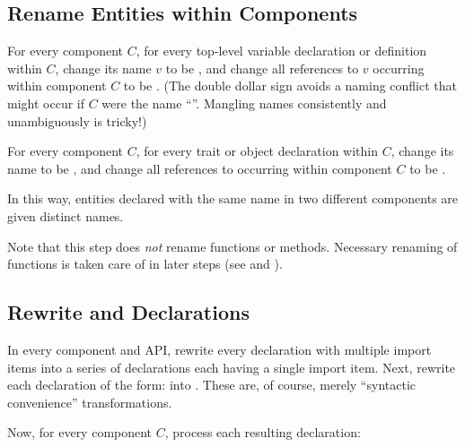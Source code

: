 \subsection{Rename Entities within Components}

For every component $C$, for every top-level variable declaration or definition
within $C$, change its name $v$ to be , and change
all references to $v$ occurring within component $C$ to be .
(The double dollar sign avoids a naming conflict that might occur if
$C$ were the name ``''.  Mangling names consistently 
and unambiguously is tricky!)

For every component $C$, for every trait or object declaration
within $C$, change its name  to be , and change
all references to  occurring within component $C$ to be .

In this way, entities declared with the same name in two different
components are given distinct names.

Note that this step does {\it not} rename functions or methods.
Necessary renaming of functions is taken care of in later steps
(see  and ).

\subsection{Rewrite  and  Declarations}

In every component and API, rewrite every  declaration with multiple import items into
a series of  declarations each having a single import item.
Next, rewrite each  declaration of the form:
 into .  These are, of course,
merely ``syntactic convenience'' transformations.

Now, for every component $C$, process each resulting  declaration:
\begin{codeexamplesize}
\begin{tabbing}
\end{tabbing}
\end{codeexamplesize}

